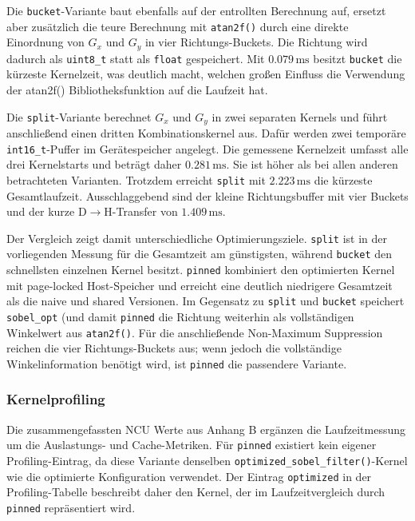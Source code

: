Die \texttt{bucket}-Variante baut ebenfalls auf der entrollten Berechnung
auf, ersetzt aber zusätzlich die teure Berechnung mit \texttt{atan2f()} durch
eine direkte Einordnung von $G_x$ und $G_y$ in vier Richtungs-Buckets. Die
Richtung wird dadurch als \texttt{uint8\_t} statt als \texttt{float}
gespeichert. Mit $0.079\,\mathrm{ms}$ besitzt \texttt{bucket} die kürzeste
Kernelzeit, was deutlich macht, welchen großen Einfluss die Verwendung der atan2f() Bibliotheksfunktion auf die Laufzeit hat.

Die \texttt{split}-Variante berechnet $G_x$ und $G_y$ in zwei separaten
Kernels und führt anschließend einen dritten Kombinationskernel aus. Dafür
werden zwei temporäre \texttt{int16\_t}-Puffer im Gerätespeicher angelegt.
Die gemessene Kernelzeit umfasst alle drei Kernelstarts und beträgt daher
$0.281\,\mathrm{ms}$. Sie ist höher als bei allen anderen betrachteten
Varianten. Trotzdem erreicht \texttt{split} mit $2.223\,\mathrm{ms}$ die
kürzeste Gesamtlaufzeit. Ausschlaggebend sind der kleine
Richtungsbuffer mit vier Buckets und der kurze D$\to$H-Transfer von
$1.409\,\mathrm{ms}$.

Der Vergleich zeigt damit unterschiedliche Optimierungsziele. \texttt{split}
ist in der vorliegenden Messung für die Gesamtzeit am günstigsten, während
\texttt{bucket} den schnellsten einzelnen Kernel besitzt. \texttt{pinned}
kombiniert den optimierten Kernel mit page-locked Host-Speicher und erreicht
eine deutlich niedrigere Gesamtzeit als die naive und shared Versionen. Im Gegensatz zu
\texttt{split} und \texttt{bucket} speichert \texttt{sobel\_opt} (und damit \texttt{pinned} die Richtung
weiterhin als vollständigen Winkelwert aus \texttt{atan2f()}. Für die
anschließende Non-Maximum Suppression reichen die vier Richtungs-Buckets aus;
wenn jedoch die vollständige Winkelinformation benötigt wird, ist
\texttt{pinned} die passendere Variante.

\subsubsection{Kernelprofiling}

Die zusammengefassten NCU Werte aus Anhang B ergänzen die
Laufzeitmessung um die Auslastungs- und Cache-Metriken. Für \texttt{pinned}
existiert kein eigener Profiling-Eintrag, da diese Variante denselben
\texttt{optimized\_sobel\_filter()}-Kernel wie die optimierte Konfiguration
verwendet. Der Eintrag \texttt{optimized} in der Profiling-Tabelle beschreibt
daher den Kernel, der im Laufzeitvergleich durch \texttt{pinned} repräsentiert
wird.

